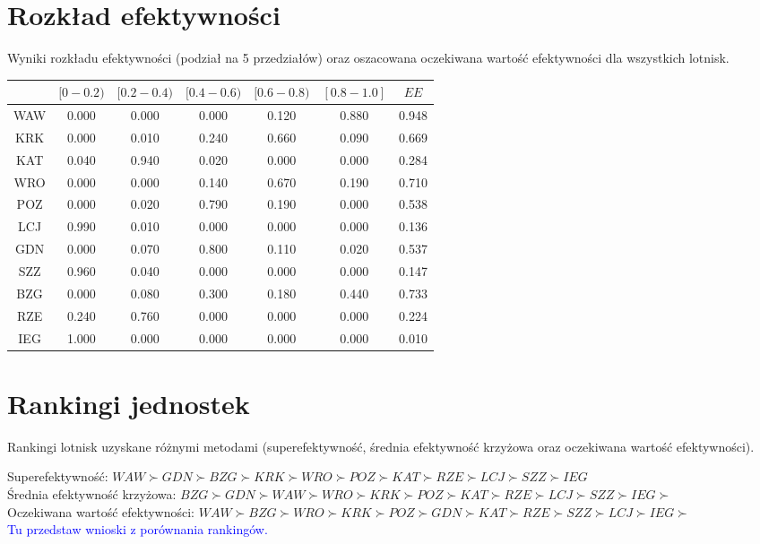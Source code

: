 \documentclass[a4paper,12pt]{article}
\begin{document}
\section{Rozkład efektywności}
Wyniki rozkładu efektywności (podział na 5 przedziałów) oraz oszacowana oczekiwana wartość efektywności dla wszystkich lotnisk.
\begin{table}[H]
\begin{tabular}{c|ccccc|c}
\hline
    & $[0-0.2)$ & $[0.2-0.4)$ & $[0.4-0.6)$ & $[0.6-0.8)$ & $[0.8-1.0]$ & $EE$    \\ \hline
    WAW & 0.000 & 0.000 & 0.000 & 0.120 & 0.880 & 0.948 \\
    KRK & 0.000 & 0.010 & 0.240 & 0.660 & 0.090 & 0.669 \\
    KAT & 0.040 & 0.940 & 0.020 & 0.000 & 0.000 & 0.284 \\
    WRO & 0.000 & 0.000 & 0.140 & 0.670 & 0.190 & 0.710 \\
    POZ & 0.000 & 0.020 & 0.790 & 0.190 & 0.000 & 0.538 \\
    LCJ & 0.990 & 0.010 & 0.000 & 0.000 & 0.000 & 0.136 \\
    GDN & 0.000 & 0.070 & 0.800 & 0.110 & 0.020 & 0.537 \\
    SZZ & 0.960 & 0.040 & 0.000 & 0.000 & 0.000 & 0.147 \\
    BZG & 0.000 & 0.080 & 0.300 & 0.180 & 0.440 & 0.733 \\
    RZE & 0.240 & 0.760 & 0.000 & 0.000 & 0.000 & 0.224 \\
    IEG & 1.000 & 0.000 & 0.000 & 0.000 & 0.000 & 0.010 \\
\hline
\end{tabular}
\label{tab:efficiency-distribution}
\end{table}

\section{Rankingi jednostek}
Rankingi lotnisk uzyskane różnymi metodami (superefektywność, średnia efektywność krzyżowa oraz oczekiwana wartość efektywności).

\noindent Superefektywność: $ WAW \succ GDN \succ BZG \succ KRK \succ WRO \succ POZ \succ KAT \succ RZE \succ LCJ \succ SZZ \succ IEG$ \\
Średnia efektywność krzyżowa: $ BZG \succ GDN \succ WAW \succ WRO \succ KRK \succ POZ \succ KAT \succ RZE \succ LCJ \succ SZZ \succ IEG \succ $ \\
Oczekiwana wartość efektywności: $ WAW \succ BZG \succ WRO \succ KRK \succ POZ \succ GDN \succ KAT \succ RZE \succ SZZ \succ LCJ \succ IEG \succ $ \\

\textcolor{blue}{Tu przedstaw wnioski z porównania rankingów.}
\end{document}
